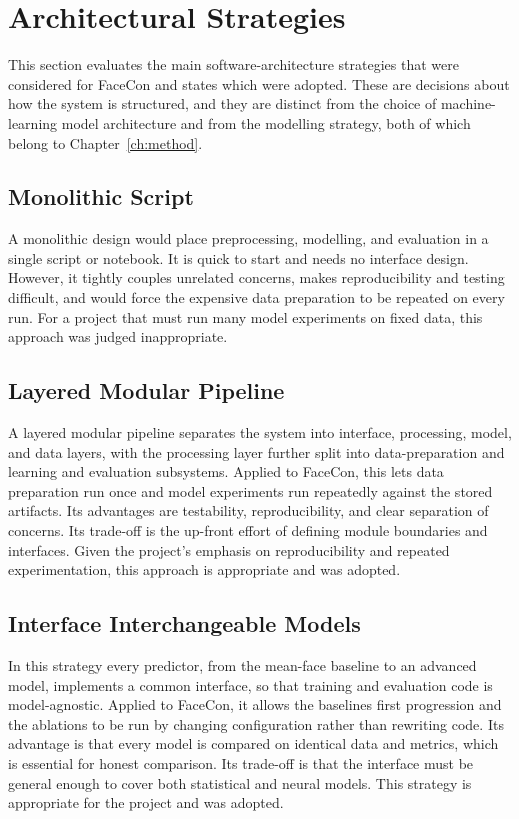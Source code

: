 \section{Architectural Strategies}
This section evaluates the main software-architecture strategies that were considered for FaceCon and states which were adopted. These are decisions about how the system is structured, and they are distinct from the choice of machine-learning model architecture and from the modelling strategy, both of which belong to Chapter~\ref{ch:method}.

\subsection{Monolithic Script}
A monolithic design would place preprocessing, modelling, and evaluation in a single script or notebook. It is quick to start and needs no interface design. However, it tightly couples unrelated concerns, makes reproducibility and testing difficult, and would force the expensive data preparation to be repeated on every run. For a project that must run many model experiments on fixed data, this approach was judged inappropriate.

\subsection{Layered Modular Pipeline}
A layered modular pipeline separates the system into interface, processing, model, and data layers, with the processing layer further split into data-preparation and learning and evaluation subsystems. Applied to FaceCon, this lets data preparation run once and model experiments run repeatedly against the stored artifacts. Its advantages are testability, reproducibility, and clear separation of concerns. Its trade-off is the up-front effort of defining module boundaries and interfaces. Given the project's emphasis on reproducibility and repeated experimentation, this approach is appropriate and was adopted.

\subsection{Interface Interchangeable Models}
In this strategy every predictor, from the mean-face baseline to an advanced model, implements a common interface, so that training and evaluation code is model-agnostic. Applied to FaceCon, it allows the baselines first progression and the ablations to be run by changing configuration rather than rewriting code. Its advantage is that every model is compared on identical data and metrics, which is essential for honest comparison. Its trade-off is that the interface must be general enough to cover both statistical and neural models. This strategy is appropriate for the project and was adopted.

